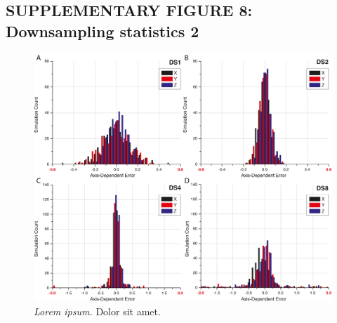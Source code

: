 \documentclass[]{spie}  %
\begin{document}
\pagebreak



\subsection*{SUPPLEMENTARY FIGURE 8: Downsampling statistics 2}
\vspace{1mm}
\begin{figure}[h!]
\includegraphics[width=\textwidth]{fig-downsampling-statistics-2.png}
\vspace{-2.0mm}
\caption{\hspace{-0.5mm} \emph{Lorem ipsum.} Dolor sit amet.
}
\label{fig:sup-fig-downsampling-statistics-2}
\end{figure}

\pagebreak
\end{document}
